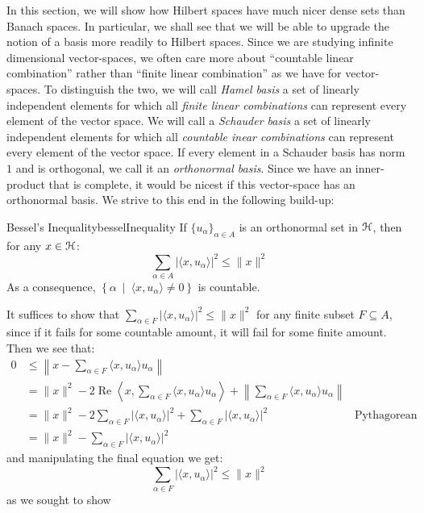 \documentclass[oneside]{book}
\newcommand{\EH}{\EuScript{H}}
\newcommand{\sse}{\subseteq}
\renewcommand{\Re}{\operatorname{Re}}
\newcommand{\set}[2]{\left\{#1 \ \middle|\ #2\right\}}
\begin{document}
In this section, we will show how Hilbert spaces have much nicer dense sets than Banach spaces. In particular, we shall
see that we will be able to upgrade the notion of a basis more readily to Hilbert spaces. Since we are studying infinite
dimensional vector-spaces, we often care more about ``countable linear combination'' rather than ``finite linear
combination'' as we have for vector-spaces. To distinguish the two, we will call \emph{Hamel basis} a set of linearly
independent elements for which all \emph{finite linear combinations} can represent every element of the vector space. We
will call a \emph{Schauder basis} a set of linearly independent elements for which all \emph{countable inear
combinations} can represent every element of the vector space. If every element in a Schauder basis has norm $1$ and is
orthogonal, we call it an \emph{orthonormal basis}. Since we have an inner-product that is complete, it would be nicest
if this vector-space has an orthonormal basis. We strive to this end in the following build-up:

\begin{thm}{Bessel's Inequality}{besselInequality}
If $\{u_\alpha\}_{\alpha \in A}$ is an orthonormal set in $\EH$, then for any $x \in \EH$:
\[
	\sum_{\alpha \in A} | \langle x, u_\alpha\rangle|^2 \le \|x\|^2
\]
As a consequence, $\set{\alpha}{ \langle x, u_\alpha \rangle \ne 0 }$ is countable.
\end{thm}

\begin{Proof}
It suffices to show that $\sum_{\alpha \in F} | \langle x, u_\alpha \rangle|^2 \le \|x\|^2$ for any finite subset $F
\sse A$, since if it fails for some countable amount, it will fail for some finite amount. Then we see that:
\begin{align*}
	0 &\le \left\|x - \sum_{\alpha \in F} \langle x, u_\alpha\rangle u_\alpha\right\|\\
	  &=  \|x\|^2 - 2\Re\left\langle x , \sum_{\alpha \in F} \langle x, u_\alpha\rangle u_\alpha\right\rangle + \left\|
	  \sum_{\alpha \in F} \langle x, u_\alpha\rangle u_\alpha\right\|\\
	  &= \|x\|^2 - 2\sum_{\alpha \in F}|\langle x, u_\alpha\rangle|^2 + \sum_{\alpha \in F} |\langle x,
	u_\alpha\rangle|^2 &\text{Pythagorean Theorem}\\
	  &= \|x\|^2 - \sum_{\alpha \in F} |\langle x, u_\alpha\rangle|^2
\end{align*}
and manipulating the final equation we get:
\[
	   \sum_{\alpha \in F} |\langle x, u_\alpha\rangle|^2 \le \|x\|^2
\]
as we sought to show
\end{Proof}
\end{document}

